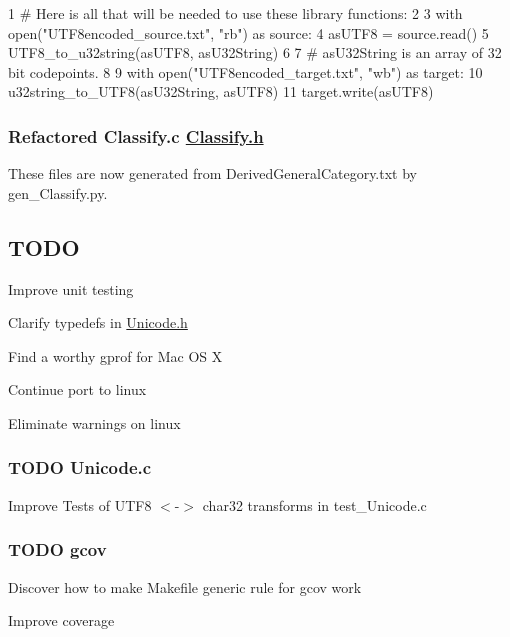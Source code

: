 \begin{DoxyCode}
1 # Here is all that will be needed to use these library functions:
2 
3 with open("UTF8encoded\_source.txt", "rb") as source:
4     asUTF8 = source.read()
5     UTF8\_to\_u32string(asUTF8, asU32String)
6 
7 # asU32String is an array of 32 bit codepoints.
8 
9 with open("UTF8encoded\_target.txt", "wb") as target:
10     u32string\_to\_UTF8(asU32String, asUTF8)
11     target.write(asUTF8)
\end{DoxyCode}


\subsubsection*{Refactored Classify.\+c \hyperlink{_classify_8h_source}{Classify.\+h}}

These files are now generated from Derived\+General\+Category.\+txt by gen\+\_\+\+Classify.\+py.

\subsection*{T\+O\+D\+O}


\begin{DoxyItemize}
\item Improve unit testing
\item Clarify typedefs in \hyperlink{_unicode_8h_source}{Unicode.\+h}
\item Find a worthy gprof for Mac O\+S X
\item Continue port to linux
\item Eliminate warnings on linux
\end{DoxyItemize}

\subsubsection*{T\+O\+D\+O Unicode.\+c}


\begin{DoxyItemize}
\item Improve Tests of U\+T\+F8 $<$-\/$>$ char32 transforms in test\+\_\+\+Unicode.\+c
\end{DoxyItemize}

\subsubsection*{T\+O\+D\+O gcov}


\begin{DoxyItemize}
\item Discover how to make Makefile generic rule for gcov work
\item Improve coverage 
\end{DoxyItemize}